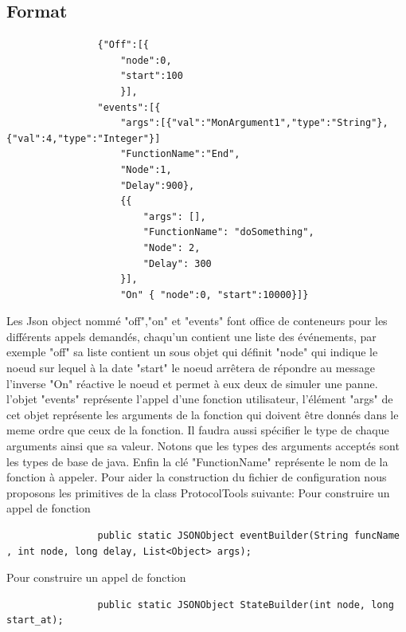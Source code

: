 \documentclass{article}
\begin{document}
			\subsection{Format}
			\begin{lstlisting}
				{"Off":[{
					"node":0,
					"start":100
					}],
				"events":[{
					"args":[{"val":"MonArgument1","type":"String"},{"val":4,"type":"Integer"}]
					"FunctionName":"End",
					"Node":1,
					"Delay":900},
					{{
						"args": [],
						"FunctionName": "doSomething",
						"Node": 2,
						"Delay": 300
					}],
					"On" { "node":0, "start":10000}]}
			\end{lstlisting}
			Les Json object nommé "off","on" et "events" font office de conteneurs pour les différents appels demandés,
			chaqu'un contient une liste des événements, par exemple {\color{magenta} "off"} sa liste contient un sous objet qui définit
			\newline
			{\color{magenta} "node"} qui indique le noeud sur lequel à la date {\color{magenta} "start"} le noeud arrêtera de répondre au message
			l'inverse {\color{magenta} "On"} réactive le noeud et permet à eux deux de simuler une panne.
			\newline
			\newline
			l'objet {\color{magenta} "events"} représente l'appel d'une fonction utilisateur, l'élément {\color{magenta} "args"} de cet objet représente les arguments de la fonction qui
			doivent être donnés dans le meme ordre que ceux de la fonction. Il faudra aussi spécifier le type de chaque arguments ainsi que sa valeur.
			\newline
			Notons que les types des arguments acceptés sont les types de base de java.
			Enfin la clé {\color{magenta} "FunctionName"} représente le nom de la fonction à appeler.
			\newline
			\newline
			Pour aider la construction du fichier de configuration nous proposons les primitives de la class ProtocolTools suivante:
			\newline
			Pour construire un appel de fonction
			\begin{lstlisting}
				public static JSONObject eventBuilder(String funcName , int node, long delay, List<Object> args);
			\end{lstlisting}
			Pour construire un appel de fonction
			\begin{lstlisting}
				public static JSONObject StateBuilder(int node, long start_at);
			\end{lstlisting}
\end{document}
